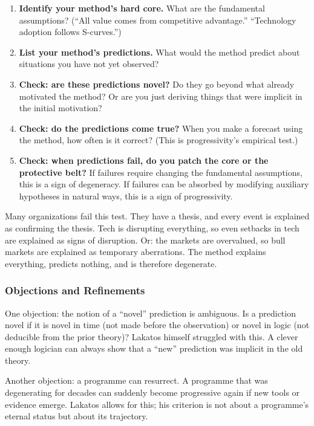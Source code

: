 \documentclass[11pt,letterpaper]{article}
\begin{document}
\begin{enumerate}
  \item \textbf{Identify your method's hard core.} What are the fundamental assumptions? (``All value comes from competitive advantage.'' ``Technology adoption follows S-curves.'')
  \item \textbf{List your method's predictions.} What would the method predict about situations you have not yet observed?
  \item \textbf{Check: are these predictions novel?} Do they go beyond what already motivated the method? Or are you just deriving things that were implicit in the initial motivation?
  \item \textbf{Check: do the predictions come true?} When you make a forecast using the method, how often is it correct? (This is progressivity's empirical test.)
  \item \textbf{Check: when predictions fail, do you patch the core or the protective belt?} If failures require changing the fundamental assumptions, this is a sign of degeneracy. If failures can be absorbed by modifying auxiliary hypotheses in natural ways, this is a sign of progressivity.
\end{enumerate}

Many organizations fail this test. They have a thesis, and every event is explained as confirming the thesis. Tech is disrupting everything, so even setbacks in tech are explained as signs of disruption. Or: the markets are overvalued, so bull markets are explained as temporary aberrations. The method explains everything, predicts nothing, and is therefore degenerate.

\subsubsection*{Objections and Refinements}

One objection: the notion of a ``novel'' prediction is ambiguous. Is a prediction novel if it is novel in time (not made before the observation) or novel in logic (not deducible from the prior theory)? Lakatos himself struggled with this. A clever enough logician can always show that a ``new'' prediction was implicit in the old theory.

Another objection: a programme can resurrect. A programme that was degenerating for decades can suddenly become progressive again if new tools or evidence emerge. Lakatos allows for this; his criterion is not about a programme's eternal status but about its trajectory.
\end{document}
